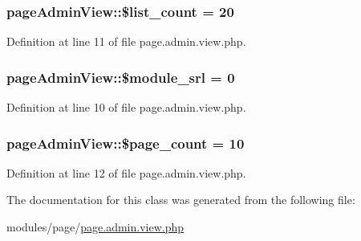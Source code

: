 \subsubsection[{\texorpdfstring{\$list\+\_\+count}{$list_count}}]{\setlength{\rightskip}{0pt plus 5cm}page\+Admin\+View\+::\$list\+\_\+count = 20}\hypertarget{classpageAdminView_af6fe6d2d80e9aa24365a9d1f765dc1b2}{}\label{classpageAdminView_af6fe6d2d80e9aa24365a9d1f765dc1b2}


Definition at line 11 of file page.\+admin.\+view.\+php.

\subsubsection[{\texorpdfstring{\$module\+\_\+srl}{$module_srl}}]{\setlength{\rightskip}{0pt plus 5cm}page\+Admin\+View\+::\$module\+\_\+srl = 0}\hypertarget{classpageAdminView_a3c9dc922fb2ef7fcc1497582905217dc}{}\label{classpageAdminView_a3c9dc922fb2ef7fcc1497582905217dc}


Definition at line 10 of file page.\+admin.\+view.\+php.

\subsubsection[{\texorpdfstring{\$page\+\_\+count}{$page_count}}]{\setlength{\rightskip}{0pt plus 5cm}page\+Admin\+View\+::\$page\+\_\+count = 10}\hypertarget{classpageAdminView_a326ed8f2249c47efa48b3fe781e11fa4}{}\label{classpageAdminView_a326ed8f2249c47efa48b3fe781e11fa4}


Definition at line 12 of file page.\+admin.\+view.\+php.



The documentation for this class was generated from the following file\+:\begin{DoxyCompactItemize}
\item 
modules/page/\hyperlink{page_8admin_8view_8php}{page.\+admin.\+view.\+php}\end{DoxyCompactItemize}
